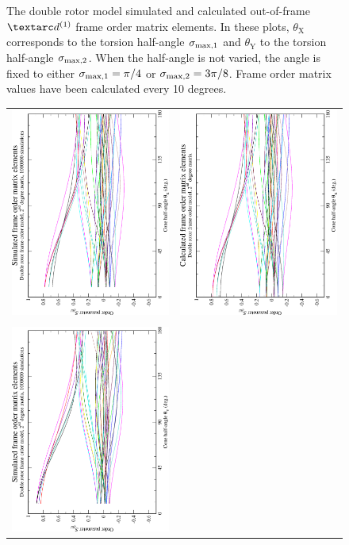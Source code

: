 \begin{figure}
\begin{tabular}{@{}cc@{}}
  \end{tabular}
  \caption[Double rotor simulated and calculated out-of-frame Daeg$^{(1)}$ elements.]{
    The double rotor model simulated and calculated out-of-frame $\FOone$ frame order matrix elements.
    In these plots, $\theta_\textrm{X}$ corresponds to the torsion half-angle $\sigma_{\textrm{max,1}}$ and $\theta_\textrm{Y}$ to the torsion half-angle $\sigma_{\textrm{max,2}}$.
    When the half-angle is not varied, the angle is fixed to either $\sigma_{\textrm{max,1}} = \pi/4$ or $\sigma_{\textrm{max,2}} = 3\pi/8$.
    Frame order matrix values have been calculated every 10 degrees.
  }
  \label{fig: simulated and calculated out-of-frame 1st degree double rotor frame order}
\end{figure}

\begin{figure}
\centering
  \begin{tabular}{@{}cc@{}}
    \includegraphics[width=.35\textwidth,angle=270]{images/frame_order_matrix/Sijkl_double_rotor_out_of_frame_theta_x_ens1000000.eps} &
    \includegraphics[width=.35\textwidth,angle=270]{images/frame_order_matrix/Sijkl_double_rotor_out_of_frame_theta_x_calc.eps} \\
    \\[-5pt]
    \includegraphics[width=.35\textwidth,angle=270]{images/frame_order_matrix/Sijkl_double_rotor_out_of_frame_theta_y_ens1000000.eps} &

\end{tabular}
\end{figure}
